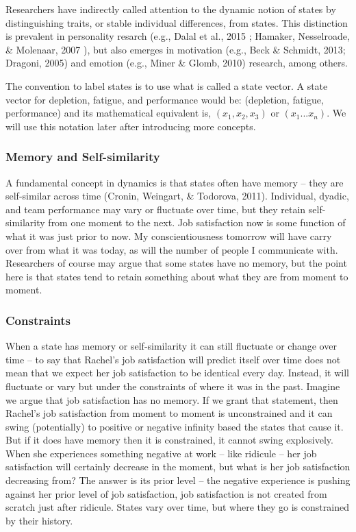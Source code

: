 \documentclass[english,,man]{apa6}
\theoremstyle{definition}
\theoremstyle{definition}
\theoremstyle{definition}
\theoremstyle{remark}
\begin{document}
Researchers have indirectly called attention to the dynamic notion of
states by distinguishing traits, or stable individual differences, from
states. This distinction is prevalent in personality resarch (e.g.,
Dalal et al., 2015 ; Hamaker, Nesselroade, \& Molenaar, 2007 ), but also
emerges in motivation (e.g., Beck \& Schmidt, 2013; Dragoni, 2005) and
emotion (e.g., Miner \& Glomb, 2010) research, among others.

The convention to label states is to use what is called a state vector.
A state vector for depletion, fatigue, and performance would be:
(depletion, fatigue, performance) and its mathematical equivalent is,
\((x_1, x_2, x_3)\) or \((x_1 ...x_n)\). We will use this notation later
after introducing more concepts.

\hypertarget{memory-and-self-similarity}{%
\subsubsection{Memory and
Self-similarity}\label{memory-and-self-similarity}}

A fundamental concept in dynamics is that states often have memory --
they are self-similar across time (Cronin, Weingart, \& Todorova, 2011).
Individual, dyadic, and team performance may vary or fluctuate over
time, but they retain self-similarity from one moment to the next. Job
satisfaction now is some function of what it was just prior to now. My
conscientiousness tomorrow will have carry over from what it was today,
as will the number of people I communicate with. Researchers of course
may argue that some states have no memory, but the point here is that
states tend to retain something about what they are from moment to
moment.

\hypertarget{constraints}{%
\subsubsection{Constraints}\label{constraints}}

When a state has memory or self-similarity it can still fluctuate or
change over time -- to say that Rachel's job satisfaction will predict
itself over time does not mean that we expect her job satisfaction to be
identical every day. Instead, it will fluctuate or vary but under the
constraints of where it was in the past. Imagine we argue that job
satisfaction has no memory. If we grant that statement, then Rachel's
job satisfaction from moment to moment is unconstrained and it can swing
(potentially) to positive or negative infinity based the states that
cause it. But if it does have memory then it is constrained, it cannot
swing explosively. When she experiences something negative at work --
like ridicule -- her job satisfaction will certainly decrease in the
moment, but what is her job satisfaction decreasing from? The answer is
its prior level -- the negative experience is pushing against her prior
level of job satisfaction, job satisfaction is not created from scratch
just after ridicule. States vary over time, but where they go is
constrained by their history.
\end{document}
